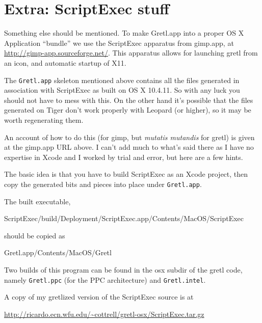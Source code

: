 \documentclass{article}
\begin{document}
\section{Extra: ScriptExec stuff}

Something else should be mentioned.  To make Gretl.app into a proper
OS X Application ``bundle'' we use the ScriptExec apparatus from
gimp.app, at \url{http://gimp-app.sourceforge.net/}.  This apparatus
allows for launching gretl from an icon, and automatic startup of X11.

The \texttt{Gretl.app} skeleton mentioned above contains all the files
generated in association with ScriptExec as built on OS X 10.4.11.
So with any luck you should not have to mess with this.  On the other
hand it's possible that the files generated on Tiger don't work
properly with Leopard (or higher), so it may be worth regenerating
them.

An account of how to do this (for gimp, but \textit{mutatis mutandis}
for gretl) is given at the gimp.app URL above.  I can't add much to
what's said there as I have no expertise in Xcode and I worked by
trial and error, but here are a few hints.

The basic idea is that you have to build ScriptExec as an
Xcode project, then copy the generated bits and pieces into place
under \texttt{Gretl.app}.

The built executable,

\begin{code}
ScriptExec/build/Deployment/ScriptExec.app/Contents/MacOS/ScriptExec
\end{code}

should be copied as

\begin{code}
Gretl.app/Contents/MacOS/Gretl
\end{code}

Two builds of this program can be found in the osx subdir of the gretl
code, namely \texttt{Gretl.ppc} (for the PPC architecture) and
\texttt{Gretl.intel}.

A copy of my gretlized version of the ScriptExec source is at

\url{http://ricardo.ecn.wfu.edu/~cottrell/gretl-osx/ScriptExec.tar.gz}
\end{document}
